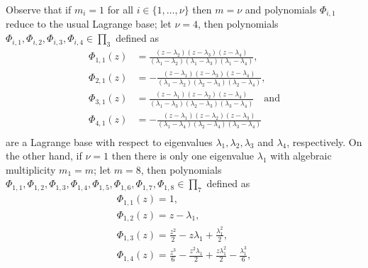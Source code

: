 \begin{remark}
Observe that if $m_{i}=1$ for all $i\in\lbrace 1, \ldots, \nu\rbrace$ then $m=\nu$
and polynomials $\Phi_{i,1}$ reduce to the usual Lagrange base;
let $\nu=4$, then polynomials
$\Phi_{i,1},\Phi_{i,2},\Phi_{i,3},\Phi_{i,4} \in\prod_{3}$ defined as 
\begin{displaymath}
\begin{split}
\Phi_{ 1, 1 }{\left (z \right )} &= \frac{\left(z - \lambda_{2}\right)
\left(z - \lambda_{3}\right) \left(z - \lambda_{4}\right)}{\left(\lambda_{1} -
\lambda_{2}\right) \left(\lambda_{1} - \lambda_{3}\right) \left(\lambda_{1} -
\lambda_{4}\right)}, \\
\Phi_{ 2, 1 }{\left (z \right )} &= - \frac{\left(z -
\lambda_{1}\right) \left(z - \lambda_{3}\right) \left(z -
\lambda_{4}\right)}{\left(\lambda_{1} - \lambda_{2}\right) \left(\lambda_{2} -
\lambda_{3}\right) \left(\lambda_{2} - \lambda_{4}\right)}, \\
\Phi_{ 3, 1 }{\left (z \right )} &= \frac{\left(z - \lambda_{1}\right) \left(z -
\lambda_{2}\right) \left(z - \lambda_{4}\right)}{\left(\lambda_{1} -
\lambda_{3}\right) \left(\lambda_{2} - \lambda_{3}\right) \left(\lambda_{3} -
\lambda_{4}\right)}\quad\text{and} \\
\Phi_{ 4, 1 }{\left (z \right )} &= - \frac{\left(z -
\lambda_{1}\right) \left(z - \lambda_{2}\right) \left(z -
\lambda_{3}\right)}{\left(\lambda_{1} - \lambda_{4}\right) \left(\lambda_{2} -
\lambda_{4}\right) \left(\lambda_{3} - \lambda_{4}\right)}\\
\end{split}
\end{displaymath}
are a Lagrange base with respect to eigenvalues $\lambda_{1},
\lambda_{2},\lambda_{3}$ and $\lambda_{4}$, respectively.  On the other hand,
if $\nu=1$ then there is only one eigenvalue $\lambda_{1}$ with algebraic
    multiplicity $m_{1}=m$; let $m=8$, then polynomials
    $\Phi_{1,1},\Phi_{1,2},\Phi_{1,3},\Phi_{1,4},\Phi_{1,5},\Phi_{1,6},\Phi_{1,7},\Phi_{1,8}\in\prod_{7}$
    defined as
\begin{equation}
\begin{array}{c}
\Phi_{ 1, 1 }{\left (z \right )} = 1, \\ 
\Phi_{ 1, 2 }{\left (z \right )} = z - \lambda_{1}, \\ 
\Phi_{ 1, 3 }{\left (z \right )} = \frac{z^{2}}{2} - z \lambda_{1} + \frac{\lambda_{1}^{2}}{2},\\ 
\Phi_{ 1, 4 }{\left (z \right )} = \frac{z^{3}}{6} - \frac{z^{2} \lambda_{1}}{2} + \frac{z \lambda_{1}^{2}}{2} - \frac{\lambda_{1}^{3}}{6}, \\ 

\end{array}
\end{equation}
\end{remark}
